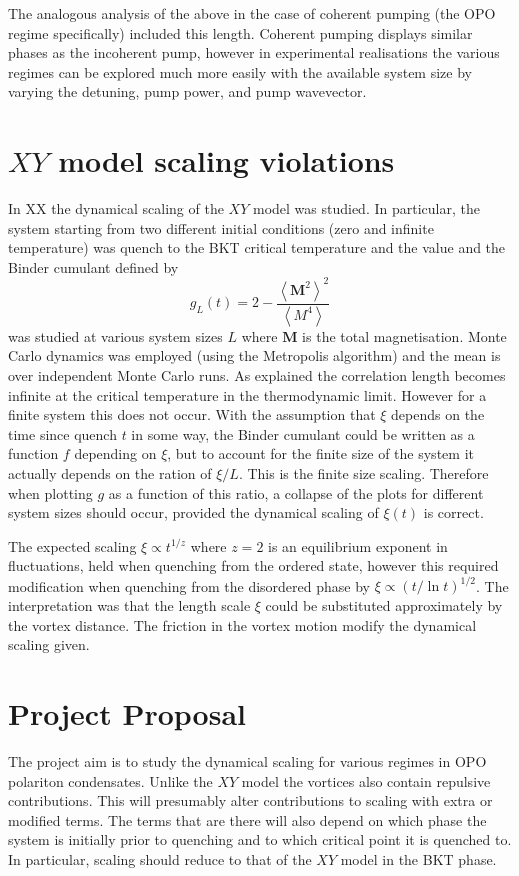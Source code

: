 \documentclass[letterpaper, 10 pt, conference]{IEEEtran}  %
\newcommand{\mean}[1]{\left < #1 \right >}
\newcommand{\myvec}[1]{\boldsymbol{#1}}
\begin{document}
The analogous analysis of the above in the case of coherent pumping (the OPO regime specifically) included this length.
Coherent pumping displays similar phases as the incoherent pump, however in experimental realisations the various regimes can be explored much more easily with the available system size by varying the detuning, pump power, and pump wavevector. 

\section{$XY$ model scaling violations}

In XX the dynamical scaling of the $XY$ model was studied. 
In particular, the system starting from two different initial conditions (zero and infinite temperature) was quench to the BKT critical temperature and the value and the Binder cumulant defined by 
\[
g_L(t) = 2 - \frac{\mean{\myvec{M}^2}^2}{\mean{M^4}}
\]
was studied at various system sizes $L$ where $\myvec{M}$ is the total magnetisation. 
Monte Carlo dynamics was employed (using the Metropolis algorithm) and the mean is over independent Monte Carlo runs. 
As explained the correlation length becomes infinite at the critical temperature in the thermodynamic limit. 
However for a finite system this does not occur. 
With the assumption that $\xi$ depends on the time since quench $t$ in some way, the Binder cumulant could be written as a function $f$ depending on $\xi$, but to account for the finite size of the system it actually depends on the ration of $\xi/L$.
This is the finite size scaling. 
Therefore when plotting $g$ as a function of this ratio, a collapse of the plots for different system sizes should occur, provided the dynamical scaling of $\xi(t)$ is correct. 

The expected scaling $\xi \propto t^{1/z}$ where $z=2$ is an equilibrium exponent in fluctuations, held when quenching from the ordered state, however this required modification when quenching from the disordered phase by $\xi \propto (t/\ln t)^{1/2}$. 
The interpretation was that the length scale $\xi$ could be substituted approximately by the vortex distance. 
The friction in the vortex motion modify the dynamical scaling given.  

\section{Project Proposal}

The project aim is to study the dynamical scaling for various regimes in OPO polariton condensates. 
Unlike the $XY$ model the vortices also contain repulsive contributions. 
This will presumably alter contributions to scaling with extra or modified terms. 
The terms that are there will also depend on which phase the system is initially prior to quenching and to which critical point it is quenched to. 
In particular, scaling should reduce to that of the $XY$ model in the BKT phase.
\end{document}
